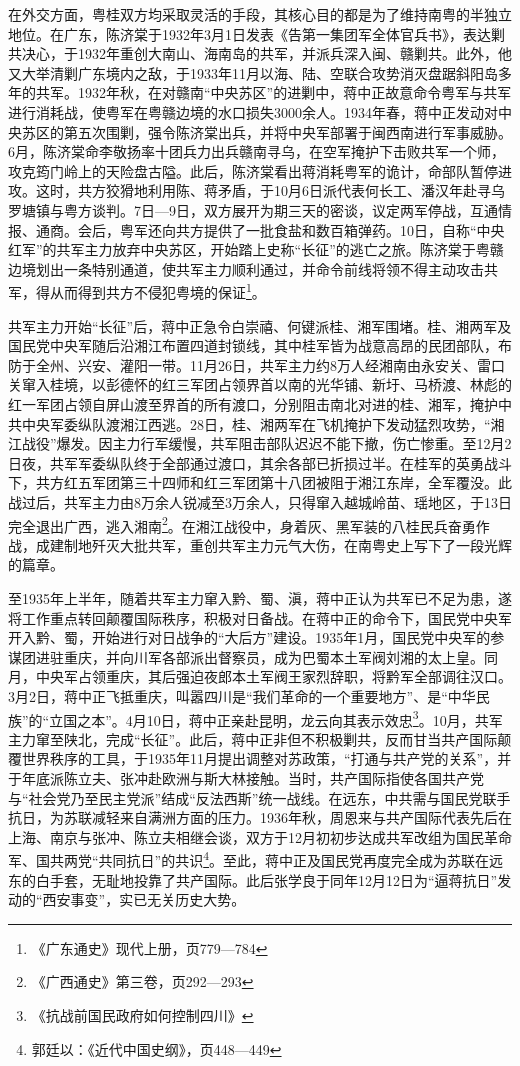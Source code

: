 在外交方面，粤桂双方均采取灵活的手段，其核心目的都是为了维持南粤的半独立地位。在广东，陈济棠于1932年3月1日发表《告第一集团军全体官兵书》，表达剿共决心，于1932年重创大南山、海南岛的共军，并派兵深入闽、赣剿共。此外，他又大举清剿广东境内之敌，于1933年11月以海、陆、空联合攻势消灭盘踞斜阳岛多年的共军。1932年秋，在对赣南“中央苏区”的进剿中，蒋中正故意命令粤军与共军进行消耗战，使粤军在粤赣边境的水口损失3000余人。1934年春，蒋中正发动对中央苏区的第五次围剿，强令陈济棠出兵，并将中央军部署于闽西南进行军事威胁。6月，陈济棠命李敬扬率十团兵力出兵赣南寻乌，在空军掩护下击败共军一个师，攻克筠门岭上的天险盘古隘。此后，陈济棠看出蒋消耗粤军的诡计，命部队暂停进攻。这时，共方狡猾地利用陈、蒋矛盾，于10月6日派代表何长工、潘汉年赴寻乌罗塘镇与粤方谈判。7日—9日，双方展开为期三天的密谈，议定两军停战，互通情报、通商。会后，粤军还向共方提供了一批食盐和数百箱弹药。10日，自称“中央红军”的共军主力放弃中央苏区，开始踏上史称“长征”的逃亡之旅。陈济棠于粤赣边境划出一条特别通道，使共军主力顺利通过，并命令前线将领不得主动攻击共军，得从而得到共方不侵犯粤境的保证\footnote{《广东通史》现代上册，页779—784}。

共军主力开始“长征”后，蒋中正急令白崇禧、何键派桂、湘军围堵。桂、湘两军及国民党中央军随后沿湘江布置四道封锁线，其中桂军皆为战意高昂的民团部队，布防于全州、兴安、灌阳一带。11月26日，共军主力约8万人经湘南由永安关、雷口关窜入桂境，以彭德怀的红三军团占领界首以南的光华铺、新圩、马桥渡、林彪的红一军团占领自屏山渡至界首的所有渡口，分别阻击南北对进的桂、湘军，掩护中共中央军委纵队渡湘江西逃。28日，桂、湘两军在飞机掩护下发动猛烈攻势，“湘江战役”爆发。因主力行军缓慢，共军阻击部队迟迟不能下撤，伤亡惨重。至12月2日夜，共军军委纵队终于全部通过渡口，其余各部已折损过半。在桂军的英勇战斗下，共方红五军团第三十四师和红三军团第十八团被阻于湘江东岸，全军覆没。此战过后，共军主力由8万余人锐减至3万余人，只得窜入越城岭苗、瑶地区，于13日完全退出广西，逃入湘南\footnote{《广西通史》第三卷，页292—293}。在湘江战役中，身着灰、黑军装的八桂民兵奋勇作战，成建制地歼灭大批共军，重创共军主力元气大伤，在南粤史上写下了一段光辉的篇章。

至1935年上半年，随着共军主力窜入黔、蜀、滇，蒋中正认为共军已不足为患，遂将工作重点转回颠覆国际秩序，积极对日备战。在蒋中正的命令下，国民党中央军开入黔、蜀，开始进行对日战争的“大后方”建设。1935年1月，国民党中央军的参谋团进驻重庆，并向川军各部派出督察员，成为巴蜀本土军阀刘湘的太上皇。同月，中央军占领重庆，其后强迫夜郎本土军阀王家烈辞职，将黔军全部调往汉口。3月2日，蒋中正飞抵重庆，叫嚣四川是“我们革命的一个重要地方”、是“中华民族”的“立国之本”。4月10日，蒋中正亲赴昆明，龙云向其表示效忠\footnote{《抗战前国民政府如何控制四川》}。10月，共军主力窜至陕北，完成“长征”。此后，蒋中正非但不积极剿共，反而甘当共产国际颠覆世界秩序的工具，于1935年11月提出调整对苏政策，“打通与共产党的关系”，并于年底派陈立夫、张冲赴欧洲与斯大林接触。当时，共产国际指使各国共产党与“社会党乃至民主党派”结成“反法西斯”统一战线。在远东，中共需与国民党联手抗日，为苏联减轻来自满洲方面的压力。1936年秋，周恩来与共产国际代表先后在上海、南京与张冲、陈立夫相继会谈，双方于12月初初步达成共军改组为国民革命军、国共两党“共同抗日”的共识\footnote{郭廷以：《近代中国史纲》，页448—449}。至此，蒋中正及国民党再度完全成为苏联在远东的白手套，无耻地投靠了共产国际。此后张学良于同年12月12日为“逼蒋抗日”发动的“西安事变”，实已无关历史大势。

